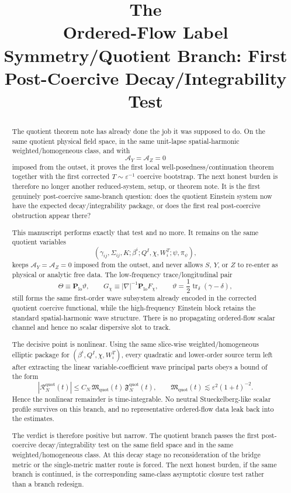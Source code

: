 \documentclass[11pt]{article}
\title{\textbf{The \TheoryName{}}\\[0.4em]
\large Ordered-Flow Label Symmetry/Quotient Branch: First Post-Coercive Decay/Integrability Test}
\author{}
\date{}
\newcommand{\AY}{\mathcal A_Y}
\newcommand{\AZ}{\mathcal A_Z}
\begin{document}
\maketitle

\begin{abstract}
The quotient theorem note has already done the job it was supposed to do. On the same quotient physical field space, in the same unit-lapse spatial-harmonic weighted/homogeneous class, and with
\[
\AY=\AZ=0
\]
imposed from the outset, it proves the first local well-posedness/continuation theorem together with the first corrected \(T\sim\varepsilon^{-1}\) coercive bootstrap. The next honest burden is therefore no longer another reduced-system, setup, or theorem note. It is the first genuinely post-coercive same-branch question: does the quotient Einstein system now have the expected decay/integrability package, or does the first real post-coercive obstruction appear there?

This manuscript performs exactly that test and no more. It remains on the same quotient variables
\[
(\gamma_{ij},\Sigma_{ij},K;\beta^i;Q^I,\chi,W_i^T;\psi,\pi_\psi),
\]
keeps \(\AY=\AZ=0\) imposed from the outset, and never allows \(S\), \(Y\), or \(Z\) to re-enter as physical or analytic free data. The low-frequency trace/longitudinal pair
\[
\Theta \equiv \mathbf P_{\mathrm{lo}}\vartheta,
\qquad
G_\chi \equiv |\nabla|^{-1}\mathbf P_{\mathrm{lo}}F_\chi,
\qquad
\vartheta=\frac12\operatorname{tr}_\delta(\gamma-\delta),
\]
still forms the same first-order wave subsystem already encoded in the corrected quotient coercive functional, while the high-frequency Einstein block retains the standard spatial-harmonic wave structure. There is no propagating ordered-flow scalar channel and hence no scalar dispersive slot to track.

The decisive point is nonlinear. Using the same slice-wise weighted/homogeneous elliptic package for \((\beta^i,Q^I,\chi,W_i^T)\), every quadratic and lower-order source term left after extracting the linear variable-coefficient wave principal parts obeys a bound of the form
\[
|\mathcal R_N^{\mathrm{quot}}(t)|
\le
C_N\,\mathfrak M_{\mathrm{quot}}(t)\,\mathfrak F_N^{\mathrm{quot}}(t),
\qquad
\mathfrak M_{\mathrm{quot}}(t)
\lesssim
\varepsilon^2(1+t)^{-2}.
\]
Hence the nonlinear remainder is time-integrable. No neutral Stueckelberg-like scalar profile survives on this branch, and no representative ordered-flow data leak back into the estimates.

The verdict is therefore positive but narrow. The quotient branch passes the first post-coercive decay/integrability test on the same field space and in the same weighted/homogeneous class. At this decay stage no reconsideration of the bridge metric or the single-metric matter route is forced. The next honest burden, if the same branch is continued, is the corresponding same-class asymptotic closure test rather than a branch redesign.
\end{abstract}
\end{document}
